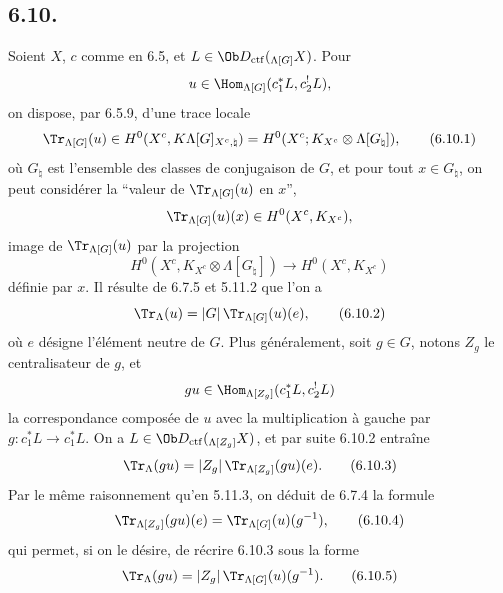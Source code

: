 \subsection*{6.10.}
Soient $X$, $c$ comme en 6.5, et $L\in\Ob D_{\mathrm{ctf}}({}_{\Lambda[G]}X)$. Pour
\[
u\in\Hom_{\Lambda[G]}(c_1^*L,c_2^!L),
\]
on dispose, par 6.5.9, d'une trace locale
\begin{equation}
\Tr_{\Lambda[G]}(u)\in
H^0(X^c,K\Lambda[G]_{X^c,\natural})
=H^0(X^c;K_{X^c}\otimes\Lambda[G_{\natural}]),
\tag{6.10.1}
\end{equation}
où $G_{\natural}$ est l'ensemble des classes de conjugaison de $G$, et pour tout $x\in G_{\natural}$, on peut considérer la ``valeur de $\Tr_{\Lambda[G]}(u)$ en $x$'',
\[
\Tr_{\Lambda[G]}(u)(x)\in H^0(X^c,K_{X^c}),
\]
image de $\Tr_{\Lambda[G]}(u)$ par la projection
\[
H^0(X^c,K_{X^c}\otimes\Lambda[G_{\natural}])
\longrightarrow H^0(X^c,K_{X^c})
\]
définie par $x$. Il résulte de 6.7.5 et 5.11.2 que l'on a
\begin{equation}
\Tr_{\Lambda}(u)=|G|\,\Tr_{\Lambda[G]}(u)(e),
\tag{6.10.2}
\end{equation}
où $e$ désigne l'élément neutre de $G$. Plus généralement, soit $g\in G$, notons $Z_g$ le centralisateur de $g$, et
\[
gu\in\Hom_{\Lambda[Z_g]}(c_1^*L,c_2^!L)
\]
la correspondance composée de $u$ avec la multiplication à gauche par $g:c_1^*L\to c_1^*L$. On a $L\in\Ob D_{\mathrm{ctf}}({}_{\Lambda[Z_g]}X)$, et par suite 6.10.2 entraîne
\begin{equation}
\Tr_{\Lambda}(gu)=|Z_g|\,\Tr_{\Lambda[Z_g]}(gu)(e).
\tag{6.10.3}
\end{equation}
Par le même raisonnement qu'en 5.11.3, on déduit de 6.7.4 la formule
\begin{equation}
\Tr_{\Lambda[Z_g]}(gu)(e)=\Tr_{\Lambda[G]}(u)(g^{-1}),
\tag{6.10.4}
\end{equation}
qui permet, si on le désire, de récrire 6.10.3 sous la forme
\begin{equation}
\Tr_{\Lambda}(gu)=|Z_g|\,\Tr_{\Lambda[G]}(u)(g^{-1}).
\tag{6.10.5}
\end{equation}

